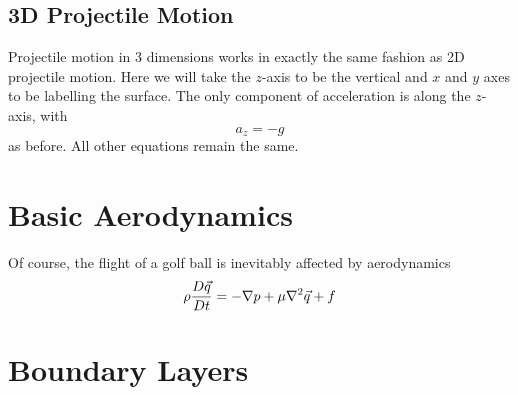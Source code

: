 \subsection{3D Projectile Motion}

Projectile motion in 3 dimensions works in exactly the same fashion as 2D projectile motion. Here we
will take the $z$-axis to be the vertical and $x$ and $y$ axes to be labelling the surface. The only
component of acceleration is along the $z$-axis, with
\[
a_z = -g
\]
as before. All other equations remain the same.

\section{Basic Aerodynamics}

Of course, the flight of a golf ball is inevitably affected by aerodynamics 
\begin{equation}
\rho \frac{D\vec{q}}{Dt} = - \nabla p + \mu \nabla^2 \vec{q} + f
\end{equation}

\section{Boundary Layers}

